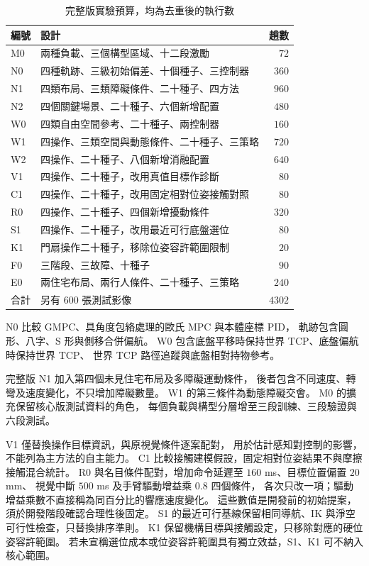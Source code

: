 \begin{table}[htbp]
    \centering
    \caption{完整版實驗預算，均為去重後的執行數}
    \small
    \renewcommand{\arraystretch}{1.15}
    \begin{tabular}{l p{} r}
        \hline
        編號 & 設計 & 趟數 \\
        \hline
        M0 & 兩種負載、三個構型區域、十二段激勵 & $72$ \\
        N0 & 四種軌跡、三級初始偏差、十個種子、三控制器 & $360$ \\
        N1 & 四類布局、三類障礙條件、二十種子、四方法 & $960$ \\
        N2 & 四個關鍵場景、二十種子、六個新增配置 & $480$ \\
        W0 & 四類自由空間參考、二十種子、兩控制器 & $160$ \\
        W1 & 四操作、三類空間與動態條件、二十種子、三策略 & $720$ \\
        W2 & 四操作、二十種子、八個新增消融配置 & $640$ \\
        V1 & 四操作、二十種子，改用真值目標作診斷 & $80$ \\
        C1 & 四操作、二十種子，改用固定相對位姿接觸對照 & $80$ \\
        R0 & 四操作、二十種子、四個新增擾動條件 & $320$ \\
        S1 & 四操作、二十種子，改用最近可行底盤選位 & $80$ \\
        K1 & 門扇操作二十種子，移除位姿容許範圍限制 & $20$ \\
        F0 & 三階段、三故障、十種子 & $90$ \\
        E0 & 兩住宅布局、兩行人條件、二十種子、三策略 & $240$ \\
        \hline
        合計 & 另有 $600$ 張測試影像 & $4302$ \\
        \hline
    \end{tabular}
\end{table}

N0 比較 GMPC、具角度包絡處理的歐氏 MPC 與本體座標 PID，
軌跡包含圓形、八字、S 形與側移合併偏航。
W0 包含底盤平移時保持世界 TCP、底盤偏航時保持世界 TCP、
世界 TCP 路徑追蹤與底盤相對持物參考。

完整版 N1 加入第四個未見住宅布局及多障礙運動條件，
後者包含不同速度、轉彎及速度變化，不只增加障礙數量。
W1 的第三條件為動態障礙交會。
M0 的擴充保留核心版測試資料的角色，
每個負載與構型分層增至三段訓練、三段驗證與六段測試。

V1 僅替換操作目標資訊，與原視覺條件逐案配對，
用於估計感知對控制的影響，不能列為主方法的自主能力。
C1 比較接觸建模假設，固定相對位姿結果不與摩擦接觸混合統計。
R0 與名目條件配對，增加命令延遲至 $160$ ms、目標位置偏置 $20$ mm、
視覺中斷 $500$ ms 及手臂驅動增益乘 $0.8$ 四個條件，
各次只改一項；驅動增益乘數不直接稱為同百分比的響應速度變化。
這些數值是開發前的初始提案，須於開發階段確認合理性後固定。
S1 的最近可行基線保留相同導航、IK 與淨空可行性檢查，只替換排序準則。
K1 保留機構目標與接觸設定，只移除對應的硬位姿容許範圍。
若未宣稱選位成本或位姿容許範圍具有獨立效益，S1、K1 可不納入核心範圍。

